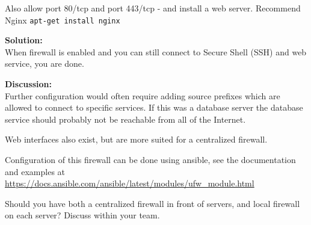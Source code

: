 \documentclass[a4paper,11pt,notitlepage]{report}
\begin{document}
Also allow port 80/tcp and port 443/tcp - and install a web server. Recommend Nginx \verb+apt-get install nginx+

{\bf Solution:}\\
When firewall is enabled and you can still connect to Secure Shell (SSH) and web service, you are done.

{\bf Discussion:}\\
Further configuration would often require adding source prefixes which are allowed to connect to specific services. If this was a database server the database service should probably not be reachable from all of the Internet.

Web interfaces also exist, but are more suited for a centralized firewall.

Configuration of this firewall can be done using ansible, see the documentation and examples at \url{https://docs.ansible.com/ansible/latest/modules/ufw_module.html}

Should you have both a centralized firewall in front of servers, and local firewall on each server? Discuss within your team.
\end{document}
